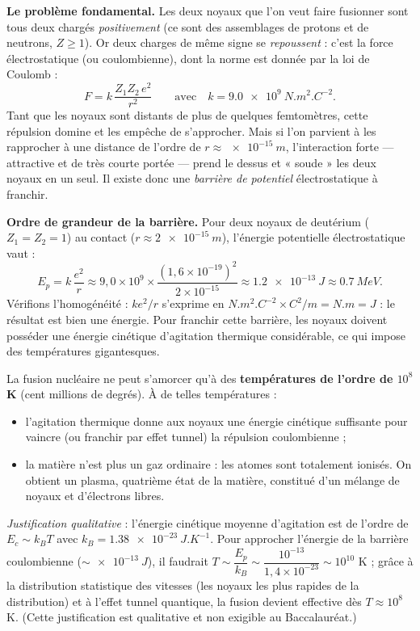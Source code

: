 \documentclass[11pt]{article}
\newcommand{\cle}[1]{{\popxbold\color{popdark}#1}}
\begin{document}
\textbf{Le problème fondamental.} Les deux noyaux que l'on veut faire fusionner sont tous deux chargés \emph{positivement} (ce sont des assemblages de protons et de neutrons, $Z \geq 1$). Or deux charges de même signe se \emph{repoussent} : c'est la force électrostatique (ou coulombienne), dont la norme est donnée par la loi de Coulomb :
\[ F = k\,\frac{Z_1 Z_2\, e^2}{r^2} \qquad \text{avec} \quad k = \SI{9,0e9}{N.m^2.C^{-2}}. \]
Tant que les noyaux sont distants de plus de quelques femtomètres, cette répulsion domine et les empêche de s'approcher. Mais si l'on parvient à les rapprocher à une distance de l'ordre de $r \approx \SI{e-15}{m}$, l'\cle{interaction forte} — attractive et de très courte portée — prend le dessus et « soude » les deux noyaux en un seul. Il existe donc une \emph{barrière de potentiel} électrostatique à franchir.

\textbf{Ordre de grandeur de la barrière.} Pour deux noyaux de deutérium ($Z_1 = Z_2 = 1$) au contact ($r \approx \SI{2e-15}{m}$), l'énergie potentielle électrostatique vaut :
\[ E_p = k\,\frac{e^2}{r} \approx 9{,}0\times 10^{9} \times \frac{(1{,}6\times 10^{-19})^2}{2\times 10^{-15}} \approx \SI{1,2e-13}{J} \approx \SI{0,7}{MeV}. \]
Vérifions l'homogénéité : $k e^2 / r$ s'exprime en $\si{N.m^2.C^{-2}} \times \si{C^2} / \si{m} = \si{N.m} = \si{J}$ : le résultat est bien une énergie. Pour franchir cette barrière, les noyaux doivent posséder une énergie cinétique d'agitation thermique considérable, ce qui impose des températures gigantesques.

\begin{propriete}
La fusion nucléaire ne peut s'amorcer qu'à des \textbf{températures de l'ordre de $10^8$ K} (cent millions de degrés). À de telles températures :
\begin{itemize}
\item l'agitation thermique donne aux noyaux une énergie cinétique suffisante pour vaincre (ou franchir par effet tunnel) la répulsion coulombienne ;
\item la matière n'est plus un gaz ordinaire : les atomes sont totalement ionisés. On obtient un \cle{plasma}, quatrième état de la matière, constitué d'un mélange de noyaux et d'électrons libres.
\end{itemize}
\emph{Justification qualitative} : l'énergie cinétique moyenne d'agitation est de l'ordre de $E_c \sim k_B T$ avec $k_B = \SI{1,38e-23}{J.K^{-1}}$. Pour approcher l'énergie de la barrière coulombienne ($\sim \SI{e-13}{J}$), il faudrait $T \sim \dfrac{E_p}{k_B} \sim \dfrac{10^{-13}}{1{,}4\times 10^{-23}} \sim 10^{10}$ K ; grâce à la distribution statistique des vitesses (les noyaux les plus rapides de la distribution) et à l'effet tunnel quantique, la fusion devient effective dès $T \approx 10^8$ K. (Cette justification est qualitative et non exigible au Baccalauréat.)
\end{propriete}
\end{document}
